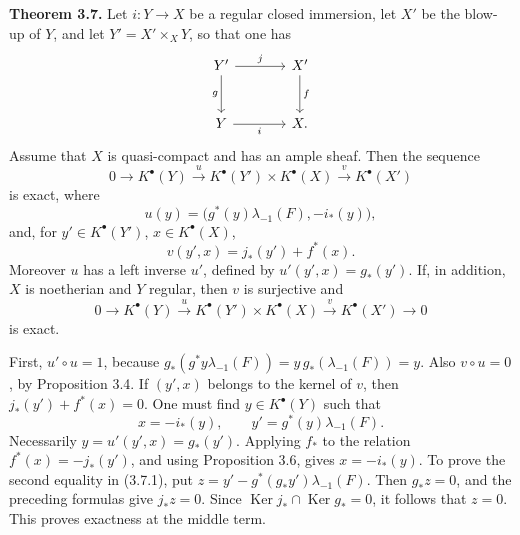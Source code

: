 \documentclass[11pt]{article}
\providecommand{\Ker}{\operatorname{Ker}}
\begin{document}
\textbf{Theorem 3.7.} Let \(i:Y\to X\) be a regular closed immersion, let \(X'\) be the blow-up of \(Y\), and let \(Y'=X'\times_XY\), so that one has
\[
\begin{tikzcd}[column sep=large,row sep=large]
Y' \arrow[r,"j"] \arrow[d,"g"'] & X' \arrow[d,"f"]\\
Y \arrow[r,"i"'] & X.
\end{tikzcd}
\]
Assume that \(X\) is quasi-compact and has an ample sheaf. Then the sequence
\begin{equation}\tag{3.7.0}
0\to K^\bullet(Y)\xrightarrow{u}K^\bullet(Y')\times K^\bullet(X)\xrightarrow{v}K^\bullet(X')
\end{equation}
is exact, where
\begin{equation}\tag{3.7.u}
u(y)=\bigl(g^*(y)\lambda_{-1}(F),-i_*(y)\bigr),
\end{equation}
and, for \(y'\in K^\bullet(Y')\), \(x\in K^\bullet(X)\),
\begin{equation}\tag{3.7.v}
v(y',x)=j_*(y')+f^*(x).
\end{equation}
Moreover \(u\) has a left inverse \(u'\), defined by \(u'(y',x)=g_*(y')\). If, in addition, \(X\) is noetherian and \(Y\) regular, then \(v\) is surjective and
\begin{equation}\tag{3.7.2}
0\to K^\bullet(Y)\xrightarrow{u}K^\bullet(Y')\times K^\bullet(X)\xrightarrow{v}K^\bullet(X')\to0
\end{equation}
is exact.

First, \(u'\circ u=1\), because \(g_*(g^*y\lambda_{-1}(F))=y\,g_*(\lambda_{-1}(F))=y\). Also \(v\circ u=0\), by Proposition 3.4. If \((y',x)\) belongs to the kernel of \(v\), then \(j_*(y')+f^*(x)=0\). One must find \(y\in K^\bullet(Y)\) such that
\begin{equation}\tag{3.7.1}
x=-i_*(y),\qquad y'=g^*(y)\lambda_{-1}(F).
\end{equation}
Necessarily \(y=u'(y',x)=g_*(y')\). Applying \(f_*\) to the relation \(f^*(x)=-j_*(y')\), and using Proposition 3.6, gives \(x=-i_*(y)\). To prove the second equality in (3.7.1), put \(z=y'-g^*(g_*y')\lambda_{-1}(F)\). Then \(g_*z=0\), and the preceding formulas give \(j_*z=0\). Since \(\Ker j_*\cap\Ker g_*=0\), it follows that \(z=0\). This proves exactness at the middle term.
\end{document}
